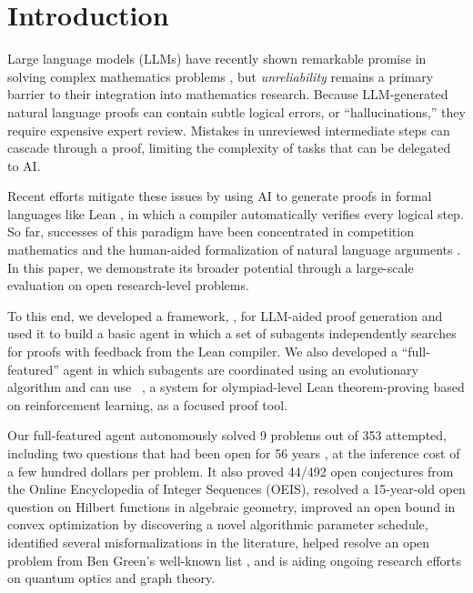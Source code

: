 \section{Introduction}

Large language models (LLMs) have recently shown remarkable promise in solving complex mathematics problems \cite{feng2026autonomous, woodruff2026accelerating}, but \emph{unreliability} remains a primary barrier to their integration into mathematics research. Because LLM-generated natural language proofs can contain subtle logical errors, or ``hallucinations,'' they require expensive expert review. Mistakes in unreviewed intermediate steps can cascade through a proof, limiting the complexity of tasks that can be delegated to AI. 

Recent efforts \cite{hubert2025olympiad, achim2025aristotle} mitigate these issues by using AI to generate proofs in formal languages like Lean \cite{moura2021lean}, in which a compiler automatically verifies every logical step. So far, successes of this paradigm have been concentrated in competition mathematics and the human-aided formalization of natural language arguments \cite{hariharan2026milestone}. 
In this paper, we demonstrate its broader potential through a large-scale evaluation on open research-level problems. 

To this end, we developed a framework, {\systemlong}, for LLM-aided proof generation and used it to build a basic agent in which a set of subagents independently searches for proofs with feedback from the Lean compiler. We also developed a ``full-featured'' agent in which subagents are coordinated using an evolutionary algorithm \cite{novikov2025alphaevolve} and can use {\AP}~\cite{hubert2025olympiad}, a system for olympiad-level Lean theorem-proving based on reinforcement learning, as a focused proof tool.

Our full-featured agent autonomously solved 9 {\erdos} problems out of 353 attempted, including two questions that had been open for 56 years \cite{SCHOEN2001191, Baier2004ANO, elsholtz2016erd}, at the inference cost of a few hundred dollars per problem. It also 
proved 44/492 open conjectures from the Online Encyclopedia of Integer Sequences (OEIS), resolved a 15-year-old open question on Hilbert functions in algebraic geometry, improved an open bound in convex optimization by discovering a novel algorithmic parameter schedule, identified several misformalizations in the literature, helped resolve an open problem from Ben Green's well-known list \cite{green2024100}, and is aiding ongoing research efforts on quantum optics and graph theory. 

